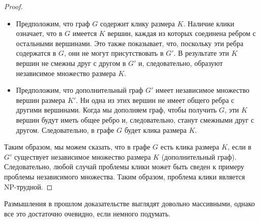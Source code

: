\begin{proof}
        \begin{itemize}
            \item Предположим, что граф $G$ содержит клику размера $K$. Наличие клики означает, что в $G$ имеется $K$ вершин, каждая из которых соединена ребром с остальными вершинами. Это также показывает, что, поскольку эти ребра содержатся в $G$, они не могут присутствовать в $G'$. В результате эти $K$ вершин не смежны друг с другом в $G'$ и, следовательно, образуют независимое множество размера $K$.
            \item Предположим, что дополнительный граф $G'$ имеет независимое множество вершин размера $K'$. Ни одна из этих вершин не имеет общего ребра с другими вершинами. Когда мы дополняем граф, чтобы получить $G$, эти $K$ вершин будут иметь общее ребро и, следовательно, станут смежными друг с другом. Следовательно, в графе $G$ будет клика размера $K$.
        \end{itemize}
        Таким образом, мы можем сказать, что в графе $G$ есть клика размера $K$, если в $G'$ существует независимое множество размера $K$ (дополнительный граф). Следовательно, любой случай проблемы клики может быть сведен к примеру проблемы независимого множества. Таким образом, проблема клики является \textsc{NP}-трудной.
    \end{proof}
    \begin{Rem}
        Размышления в прошлом доказательстве выглядят довольно массивными, однако все это достаточно очевидно, если немного подумать.
    \end{Rem}
